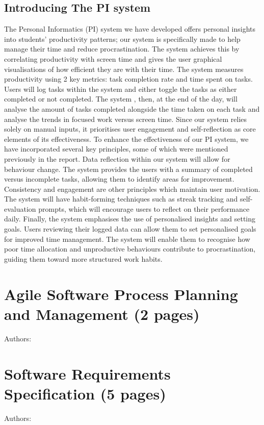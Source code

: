 \documentclass[12pt,a4paper]{article}
\begin{document}
\subsection{Introducing The PI system}
The Personal Informatics (PI) system we have developed offers personal insights into students' productivity patterns; our system is specifically made to help manage their time and reduce procrastination. The system achieves this by correlating productivity with screen time and gives the user graphical visualisations of how efficient they are with their time. The system measures productivity using 2 key metrics: task completion rate and time spent on tasks. Users will log tasks within the system and either toggle the tasks as either completed or not completed. The system , then, at the end of the day, will analyse the amount of tasks completed alongside the time taken on each task and analyse the trends in focused work versus screen time. Since our system relies solely on manual inputs, it prioritises user engagement and self-reflection as core elements of its effectiveness. To enhance the effectiveness of our PI system, we have incorporated several key principles, some of which were mentioned previously in the report. Data reflection within our system will allow for behaviour change. The system provides the users with a summary of completed versus incomplete tasks, allowing them to identify areas for improvement. Consistency and engagement are other principles which maintain user motivation. The system will have habit-forming techniques such as streak tracking and self-evaluation prompts, which will encourage users to reflect on their performance daily. Finally, the system emphasises the use of personalised insights and setting goals. Users reviewing their logged data can allow them to set personalised goals for improved time management. The system will enable them to recognise how poor time allocation and unproductive behaviours contribute to procrastination, guiding them toward more structured work habits.



\label{sec:intro}


\section{Agile Software Process Planning and Management (2 pages)}
Authors:
\label{sec:agile}


\section{Software Requirements Specification (5 pages)}
Authors:
\label{sec:requirements}
\end{document}
